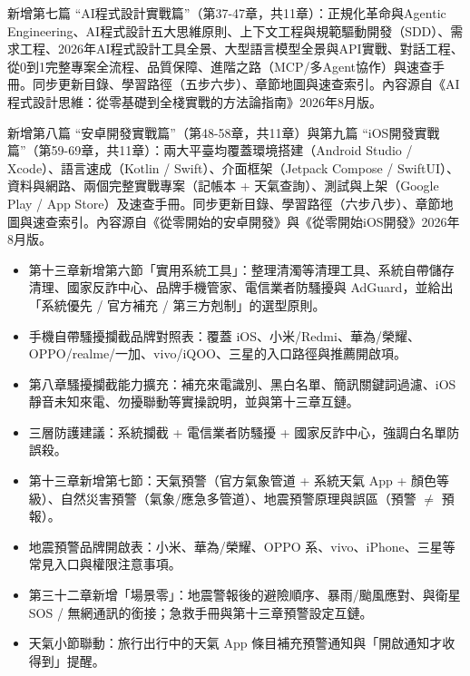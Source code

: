 
新增第七篇 “AI程式設計實戰篇”（第37-47章，共11章）：正規化革命與Agentic Engineering、AI程式設計五大思維原則、上下文工程與規範驅動開發（SDD）、需求工程、2026年AI程式設計工具全景、大型語言模型全景與API實戰、對話工程、從0到1完整專案全流程、品質保障、進階之路（MCP/多Agent協作）與速查手冊。同步更新目錄、學習路徑（五步六步）、章節地圖與速查索引。內容源自《AI程式設計思維：從零基礎到全棧實戰的方法論指南》2026年8月版。

新增第八篇 “安卓開發實戰篇”（第48-58章，共11章）與第九篇 “iOS開發實戰篇”（第59-69章，共11章）：兩大平臺均覆蓋環境搭建（Android Studio / Xcode）、語言速成（Kotlin / Swift）、介面框架（Jetpack Compose / SwiftUI）、資料與網路、兩個完整實戰專案（記帳本 + 天氣查詢）、測試與上架（Google Play / App Store）及速查手冊。同步更新目錄、學習路徑（六步八步）、章節地圖與速查索引。內容源自《從零開始的安卓開發》與《從零開始iOS開發》2026年8月版。


\begin{itemize}
  \item 第十三章新增第六節「實用系統工具」：整理清濁等清理工具、系統自帶儲存清理、國家反詐中心、品牌手機管家、電信業者防騷擾與 AdGuard，並給出「系統優先 / 官方補充 / 第三方剋制」的選型原則。
  \item 手機自帶騷擾攔截品牌對照表：覆蓋 iOS、小米/Redmi、華為/榮耀、OPPO/realme/一加、vivo/iQOO、三星的入口路徑與推薦開啟項。
  \item 第八章騷擾攔截能力擴充：補充來電識別、黑白名單、簡訊關鍵詞過濾、iOS 靜音未知來電、勿擾聯動等實操說明，並與第十三章互鏈。
  \item 三層防護建議：系統攔截 + 電信業者防騷擾 + 國家反詐中心，強調白名單防誤殺。
\end{itemize}


\begin{itemize}
  \item 第十三章新增第七節：天氣預警（官方氣象管道 + 系統天氣 App + 顏色等級）、自然災害預警（氣象/應急多管道）、地震預警原理與誤區（預警 $\neq$ 預報）。
  \item 地震預警品牌開啟表：小米、華為/榮耀、OPPO 系、vivo、iPhone、三星等常見入口與權限注意事項。
  \item 第三十二章新增「場景零」：地震警報後的避險順序、暴雨/颱風應對、與衛星 SOS / 無網通訊的銜接；急救手冊與第十三章預警設定互鏈。
  \item 天氣小節聯動：旅行出行中的天氣 App 條目補充預警通知與「開啟通知才收得到」提醒。
\end{itemize}

